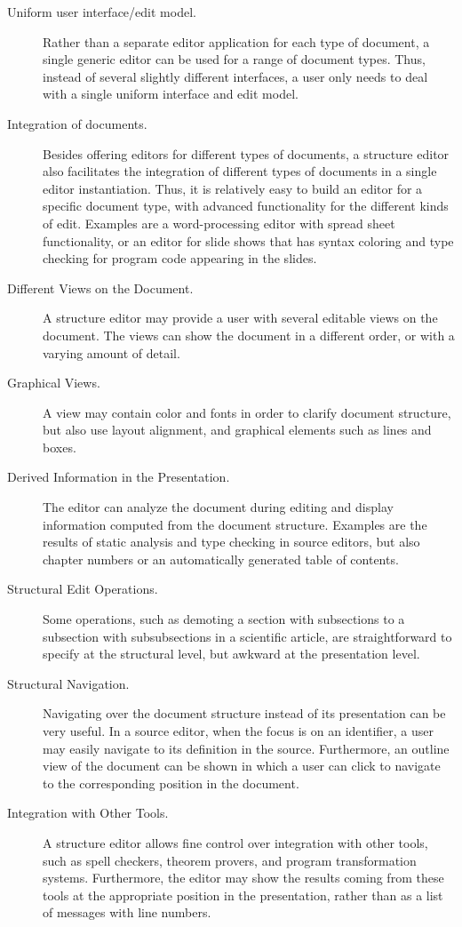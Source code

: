 \begin{description}
\item[Uniform user interface/edit model.] Rather than a separate editor application for each type of document, a single generic editor can be used for a range of document types. Thus, instead of several slightly different interfaces, a user only needs to deal with a single uniform interface and edit model.

\item[Integration of documents.] Besides offering editors for different types of documents, a structure editor also facilitates the integration of different types of documents in a single editor instantiation. Thus, it is relatively easy to build an editor for a specific document type, with advanced functionality for the different kinds of edit. Examples are a word-processing editor with spread sheet functionality, or an editor for slide shows that has syntax coloring and type checking for program code appearing in the slides.

\item[Different Views on the Document.] A structure editor may provide a user with several editable views on the document. The views can show the document in a different order, or with a varying amount of detail. 

\item[Graphical Views.] A view may contain color and fonts in order to clarify document structure, but also use layout alignment, and graphical elements such as lines and boxes.

\item[Derived Information in the Presentation.] The editor can analyze the document during editing and display information computed from the document structure. Examples are the results of static analysis and type checking in source editors, but also chapter numbers or an automatically generated table of contents.

\item[Structural Edit Operations.] Some operations, such as demoting a section with subsections to a subsection with subsubsections in a scientific article, are straightforward to specify at the structural level, but awkward at the presentation level.

\item[Structural Navigation.] Navigating over the document structure instead of its presentation can be very useful. In a source editor, when the focus is on an identifier, a user may easily navigate to its definition in the source. Furthermore, an outline view of the document can be shown in which a user can click to navigate to the corresponding position in the document.

\item[Integration with Other Tools.] A structure editor allows fine control over integration with other tools, such as spell checkers, theorem provers, and program transformation systems. Furthermore, the editor may show the results coming from these tools at the appropriate position in the presentation, rather than as a list of messages with line numbers.


\end{description}


